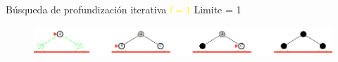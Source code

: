     \begin{frame}{Búsqueda de profundización iterativa \textcolor{Yellow}{$l=1$}}
        Limite = 1
        \begin{figure}\includegraphics[width =123mm]{63_IDS_l1.png}\end{figure}
    \end{frame}
